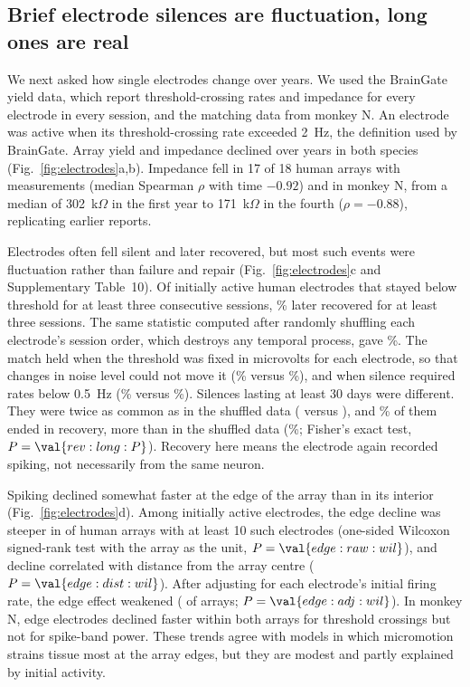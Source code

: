 \documentclass[pdflatex,sn-nature]{sn-jnl}
\begin{document}
\subsection*{Brief electrode silences are fluctuation, long ones are real}

We next asked how single electrodes change over years. We used the BrainGate yield data, which report threshold-crossing
rates and impedance for every electrode in every session\cite{hahn2026}, and the matching data from monkey N. An
electrode was active when its threshold-crossing rate exceeded 2~Hz, the definition used by BrainGate\cite{hahn2026}.
Array yield and impedance declined over years in both species (Fig.~\ref{fig:electrodes}a,b). Impedance fell in 17 of
18 human arrays with measurements (median Spearman $\rho$ with time $-0.92$) and in monkey N, from a median of
302~k$\Omega$ in the first year to 171~k$\Omega$ in the fourth ($\rho = -0.88$), replicating earlier
reports\cite{barrese2013,sponheim2021,chen2023,bjanes2025,hahn2026}.

Electrodes often fell silent and later recovered, but most such events were fluctuation rather than failure and repair
(Fig.~\ref{fig:electrodes}c and Supplementary Table~10). Of  initially active human electrodes that
stayed below threshold for at least three consecutive sessions, \% later recovered for at least three
sessions. The same statistic computed after randomly shuffling each electrode's session order, which destroys any
temporal process, gave \%. The match held when the threshold was fixed in microvolts for
each electrode, so that changes in noise level could not move it (\% versus
\%), and when silence required rates below 0.5~Hz (\% versus
\%). Silences lasting at least 30 days were different. They were twice as common as in the
shuffled data ( versus ), and \% of them
ended in recovery, more than in the shuffled data (\%; Fisher's exact test,
$P = \val{rev:long:P}$). Recovery here means the electrode again recorded spiking, not necessarily from the same
neuron.

Spiking declined somewhat faster at the edge of the array than in its interior (Fig.~\ref{fig:electrodes}d). Among
initially active electrodes, the edge decline was steeper in  of  human arrays with at
least 10 such electrodes (one-sided Wilcoxon signed-rank test with the array as the unit, $P = \val{edge:raw:wil}$), and
decline correlated with distance from the array centre ($P = \val{edge:dist:wil}$). After adjusting for each electrode's
initial firing rate, the edge effect weakened ( of  arrays; $P = \val{edge:adj:wil}$).
In monkey N, edge electrodes declined faster within both arrays for threshold crossings but not for spike-band power.
These trends agree with models in which micromotion strains tissue most at the array edges\cite{forrest2025}, but they
are modest and partly explained by initial activity.
\end{document}
